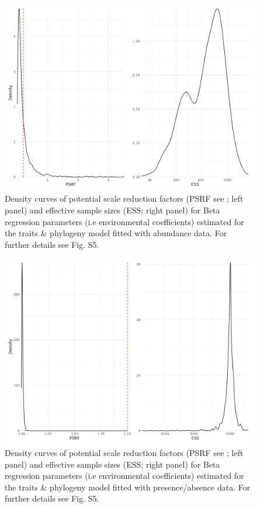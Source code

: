 \begin{figure}
\hypertarget{fig:chapt1phylo_traits_ab_beta}{%
\centering
\includegraphics{03-Chapitre1/figures/supplementary/fig_supp_conv_beta_PolychaetaPhylogenyTraitsAB.png}
\caption{Density curves of potential scale reduction factors (PSRF see
\textcite{Brooks_1998}; left panel) and effective sample sizes (ESS;
right panel) for Beta regression parameters (i.e environmental
coefficients) estimated for the traits \& phylogeny model fitted with
abundance data. For further details see Fig.
S5.}\label{fig:chapt1phylo_traits_ab_beta}
}
\end{figure}

\begin{figure}
\hypertarget{fig:chapt1phylo_traits_pa_beta}{%
\centering
\includegraphics{03-Chapitre1/figures/supplementary/fig_supp_conv_beta_PolychaetaPhylogenyTraitsPA.png}
\caption{Density curves of potential scale reduction factors (PSRF see
\textcite{Brooks_1998}; left panel) and effective sample sizes (ESS;
right panel) for Beta regression parameters (i.e environmental
coefficients) estimated for the traits \& phylogeny model fitted with
presence/absence data. For further details see Fig.
S5.}\label{fig:chapt1phylo_traits_pa_beta}
}
\end{figure}

